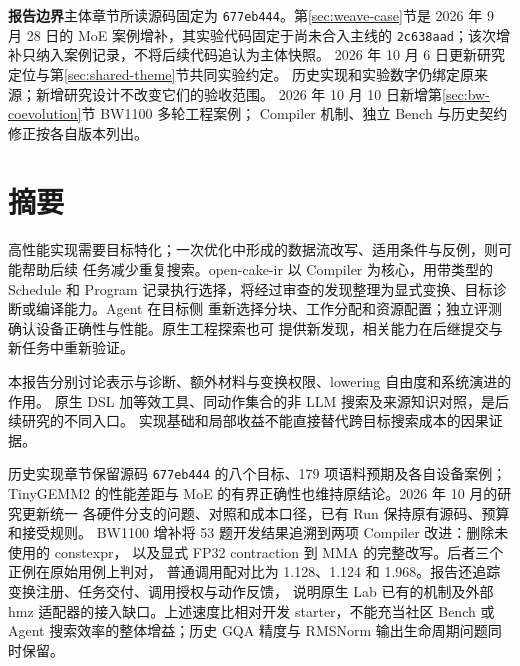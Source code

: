 \documentclass[UTF8,11pt,a4paper,fontset=none]{ctexart}
\newcommand{\code}[1]{\texttt{#1}}
\begin{document}
\begin{titlepage}
\begin{center}
\end{center}
\vfill
\begin{notebox}
\noindent\textbf{报告边界}\quad 主体章节所读源码固定为
\code{677eb444}。第\ref{sec:weave-case}节是
2026 年 9 月 28 日的 MoE 案例增补，其实验代码固定于尚未合入主线的
\code{2c638aad}；该次增补只纳入案例记录，不将后续代码追认为主体快照。
2026 年 10 月 6 日更新研究定位与第\ref{sec:shared-theme}节共同实验约定。
历史实现和实验数字仍绑定原来源；新增研究设计不改变它们的验收范围。
2026 年 10 月 10 日新增第\ref{sec:bw-coevolution}节 BW1100 多轮工程案例；
Compiler 机制、独立 Bench 与历史契约修正按各自版本列出。
\end{notebox}
\end{titlepage}
\hypersetup{pageanchor=true}

\section*{摘要}
\begin{notebox}
高性能实现需要目标特化；一次优化中形成的数据流改写、适用条件与反例，则可能帮助后续
任务减少重复搜索。open-cake-ir 以 Compiler 为核心，用带类型的 Schedule 和 Program
记录执行选择，将经过审查的发现整理为显式变换、目标诊断或编译能力。Agent 在目标侧
重新选择分块、工作分配和资源配置；独立评测确认设备正确性与性能。原生工程探索也可
提供新发现，相关能力在后继提交与新任务中重新验证。

本报告分别讨论表示与诊断、额外材料与变换权限、lowering 自由度和系统演进的作用。
原生 DSL 加等效工具、同动作集合的非 LLM 搜索及来源知识对照，是后续研究的不同入口。
实现基础和局部收益不能直接替代跨目标搜索成本的因果证据。

历史实现章节保留源码 \code{677eb444} 的八个目标、179 项语料预期及各自设备案例；
TinyGEMM2 的性能差距与 MoE 的有界正确性也维持原结论。2026 年 10 月的研究更新统一
各硬件分支的问题、对照和成本口径，已有 Run 保持原有源码、预算和接受规则。
BW1100 增补将 53 题开发结果追溯到两项 Compiler 改进：删除未使用的 constexpr，
以及显式 FP32 contraction 到 MMA 的完整改写。后者三个正例在原始用例上判对，
普通调用配对比为 1.128、1.124 和 1.968。报告还追踪变换注册、任务交付、调用授权与动作反馈，
说明原生 Lab 已有的机制及外部 hmz 适配器的接入缺口。上述速度比相对开发 starter，不能充当社区 Bench
或 Agent 搜索效率的整体增益；历史 GQA 精度与 RMSNorm 输出生命周期问题同时保留。
\end{notebox}
\end{document}
